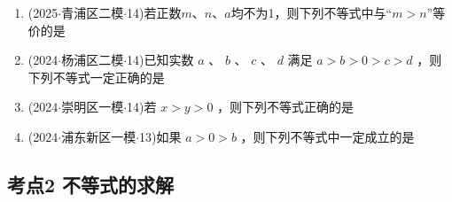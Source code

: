 \begin{enumerate}
    \item (2025$\cdot$青浦区二模$\cdot$14)若正数$m$、$n$、$a$均不为1，则下列不等式中与“$m>n$”等价的是

    \item (2024$\cdot$杨浦区二模$\cdot$14)已知实数 $a$ 、 $b$ 、 $c$ 、 $d$ 满足 $a > b > 0 > c > d$ ，则下列不等式一定正确的是

    \item (2024$\cdot$崇明区一模$\cdot$14)若 $x > y > 0$ ，则下列不等式正确的是 

    \item (2024$\cdot$浦东新区一模$\cdot$13)如果 $a > 0 > b$ ，则下列不等式中一定成立的是 
\end{enumerate}

\subsection*{考点2 不等式的求解}

